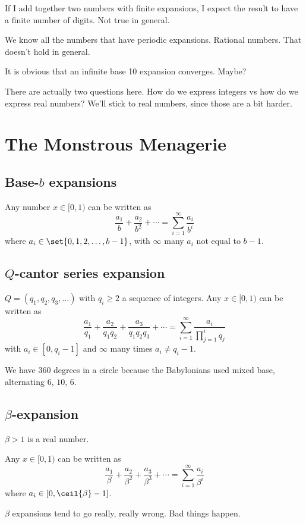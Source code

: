 \documentclass{article}
\newcommand\hoint{[0,1)}
\begin{document}
If I add together two numbers with finite expansions, I expect the result to have a finite number of
digits. Not true in general.

We know all the numbers that have periodic expansions. Rational numbers. That doesn't hold in general.

It is obvious that an infinite base 10 expansion converges. Maybe?

There are actually two questions here. How do we express integers vs how do we express real numbers?
We'll stick to real numbers, since those are a bit harder.


\section{The Monstrous Menagerie}

\subsection{Base-$b$ expansions}

Any number $x\in \hoint$
can be written as 
\[ \frac{a_1}{b} + \frac{a_2}{b^2}+\cdots = \sum_{i=1}^\infty \frac{a_i}{b^i} \]
where $a_i\in \set{0,1,2,\ldots,b-1}$, with $\infty$ many $a_i$ not equal to
$b-1$.

\subsection{$Q$-cantor series expansion}

$Q=(q_1,q_2,q_3,\ldots)$ with $q_i\ge 2$ a sequence of integers.
Any $x\in \hoint$ can be written as 
\[\frac{a_1}{q_1} + \frac{a_2}{q_1q_2} + \frac{a_3}{q_1q_2q_3} + \cdots = 
\sum_{i=1}^\infty \frac{a_i}{\prod_{j=1}^i q_j}\]
with 
$a_i\in [0,q_i-1]$ and $\infty$ many times $a_i\ne q_i-1$.

We have 360 degrees in a circle because the Babylonians used mixed base,
alternating $6$, $10$, $6$.

\subsection{$\beta$-expansion}

$\beta>1$ is a real number.

Any $x\in\hoint$ can be written as
\[ \frac{a_1}{\beta} + \frac{a_2}{\beta^2} + \frac{a_3}{\beta^3}+\cdots
=\sum_{i=1}^\infty \frac{a_i}{\beta^i}\]
where $a_i\in [0,\ceil{\beta}-1]$.

$\beta$ expansions tend to go really, really wrong. Bad things 
happen.
\end{document}
